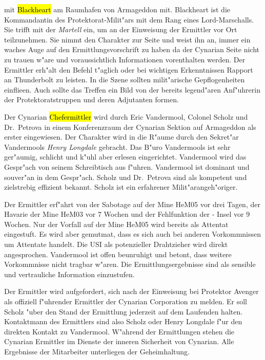 \begin{description}
		mit \hl{Blackheart} am Raumhafen von Armageddon  mit. Blackheart ist die Kommandantin des Protektorat-Milit"ars mit dem Rang eines Lord-Marschalls. Sie trifft mit der \emph{Martell} ein, um an der Einweisung der Ermittler vor Ort teilzunehmen. Sie nimmt den Charakter zur Seite und weist ihn an, immer ein waches Auge auf den Ermittlungsvorschrift zu haben da der Cynarian Seite nicht zu trauen w"are und voraussichtlich Informationen vorenthalten werden. Der Ermittler erh"alt den Befehl t"aglich oder bei wichtigen Erkenntnissen Rapport an Thunderbolt zu leisten. In die Szene sollten milit"arische Gepflogenheiten einflie\3en. Auch sollte das Treffen ein Bild von der bereits legend"aren Anf"uhrerin der Protektoratstruppen und deren Adjutanten formen.
\end{description}




Der Cynarian \hl{Chefermittler} wird durch Eric Vandermool, Colonel Scholz und Dr.~Petrova in einem Konferenzraum der Cynarian Sektion auf Armageddon als erster eingewiesen. Der Charakter wird in die R"aume durch den Sekret"ar Vandermools \emph{Henry Longdale} gebracht. Das B"uro Vandermools ist sehr ger"aumig, schlicht und k"uhl aber erlesen eingerichtet. Vandermool wird das Gespr"ach von seinem Schreibtisch aus f"uhren. Vandermool ist dominant und souver"an in dem Gespr"ach. Scholz und Dr.~Petrova sind als kompetent und zielstrebig effizient bekannt. Scholz ist ein erfahrener Milit"arangeh"origer.

Der Ermittler erf"ahrt von der Sabotage auf der Mine HeM05 vor drei Tagen, der Havarie der Mine HeM03 vor 7 Wochen und der Fehlfunktion der - Insel vor 9 Wochen. Nur der Vorfall auf der Mine HeM05 wird bereits als Attentat eingestuft. Es wird aber gemutma\3t, dass es sich auch bei anderen Vorkommnissen um Attentate handelt. Die USI als potenzieller Drahtzieher wird direkt angesprochen. Vandermool ist offen beunruhigt und betont, dass weitere Vorkommnisse nicht tragbar w"aren. Die Ermittlungsergebnisse sind als sensible und vertrauliche Information einzustufen. 

Der Ermittler wird aufgefordert, sich nach der Einweisung bei Protektor Avenger als offiziell f"uhrender Ermittler der Cynarian Corporation zu melden. Er soll Scholz "uber den Stand der Ermittlung jederzeit auf dem Laufenden halten. Kontaktmann des Ermittlers sind also Scholz oder Henry Longdale f"ur den direkten Kontakt zu Vandermool. W"ahrend der Ermittlungen stehen die Cynarian Ermittler im Dienste der inneren Sicherheit von Cynarian. Alle Ergebnisse der Mitarbeiter unterliegen der Geheimhaltung.

